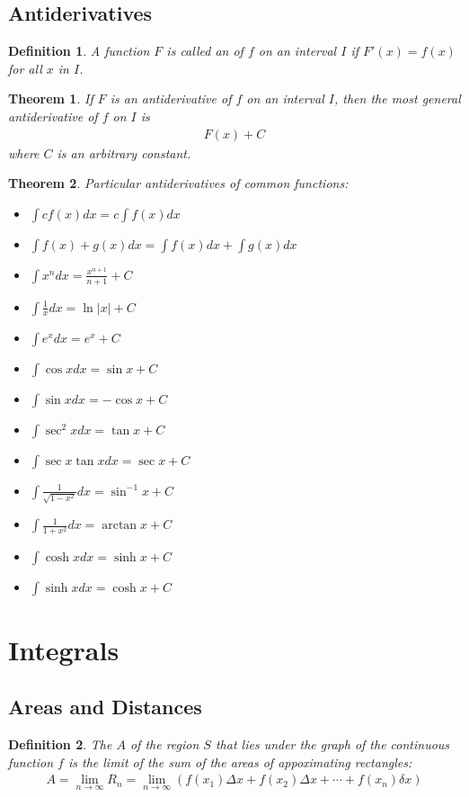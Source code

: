 \documentclass{article}
\theoremstyle{sltheorem}
\newtheorem{definition}{Definition}[section]
\newtheorem{theorem}{Theorem}[section]
\begin{document}
\subsection{Antiderivatives}
\begin{definition}
    A function $F$ is called an  of $f$ on an interval $I$ if $F'(x)=f(x)$ for all $x$ in $I$.
\end{definition}
\begin{theorem}
    If $F$ is an antiderivative of $f$ on an interval $I$, then the most general antiderivative of $f$ on $I$ is
    \begin{align*}
        F(x) + C
    \end{align*}
    where $C$ is an arbitrary constant.
\end{theorem}
\begin{theorem}
    Particular antiderivatives of common functions:
    \begin{itemize}
        \item $\int cf(x)dx = c\int f(x)dx$
        \item $\int f(x) + g(x) dx = \int f(x)dx + \int g(x)dx$
        \item $\int x^n dx=\frac{x^{n+1}}{n+1}+C$
        \item $\int \frac{1}{x}dx=\ln |x|+C$
        \item $\int e^xdx=e^x+C$
        \item $\int \cos x dx = \sin x+C$
        \item $\int \sin x dx = -\cos x +C $
        \item $\int \sec^2 x dx = \tan x + C$
        \item $\int \sec x \tan x dx = \sec x + C$
        \item $\int \frac{1}{\sqrt{1-x^2}}dx = \sin^{-1} x + C$
        \item $\int \frac{1}{1+x^2}dx = \arctan x + C$
        \item $\int \cosh x dx = \sinh x + C$
        \item $\int \sinh x dx = \cosh x + C$
    \end{itemize}
\end{theorem}
\section{Integrals}
\subsection{Areas and Distances}
\begin{definition}
  The  $A$ of the region $S$ that lies under the graph of the continuous function $f$ is the limit of the sum of the areas of appoximating rectangles:
  \begin{align*}
      A=\lim_{n\to\infty}R_n = \lim_{n\to \infty}\left(f(x_1)\Delta x + f(x_2)\Delta x + \cdots + f(x_n)\delta x\right)
  \end{align*}
\end{definition}
\end{document}
